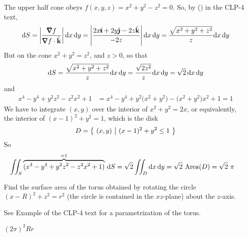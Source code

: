 \begin{solution} 
The upper half cone obeys $f(x,y,z)=x^2+y^2-z^2=0$. So,
by () in the CLP-4 text,
\begin{equation*}
\dee{S}=\left|\frac{\vnabla f}{\vnabla f\cdot\hk}\right|\dee{x}\,\dee{y}
=\left|\frac{2x\hi+2y\hj-2z\hk}{-2z}\right|\dee{x}\,\dee{y}
=\frac{\sqrt{x^2+y^2+z^2}}{z}\dee{x}\,\dee{y}
\end{equation*}
But on the cone $x^2+y^2=z^2$, and $z>0$, so that
\begin{equation*}
\mathrm{d}S=\frac{\sqrt{x^2+y^2+z^2}}{z}\mathrm{d}x\,\mathrm{d}y
=\frac{\sqrt{2z^2}}{z}\mathrm{d}x\,\mathrm{d}y
=\sqrt{2}\,\mathrm{d}x\,\mathrm{d}y
\end{equation*}
and
\begin{align*}
x^4-y^4+y^2z^2-z^2x^2+1
&=x^4-y^4+y^2\big(x^2+y^2\big)-\big(x^2+y^2)x^2+1
=1
\end{align*}
We have to integrate $(x,y)$ over the interior of $x^2+y^2=2x$,
or equivalently, the interior of $(x-1)^2+y^2=1$,
which is the disk
\begin{equation*}
D=\big\{ \ (x,y)\ \big|\ (x-1)^2+y^2\le 1\ \big\}
\end{equation*}
So
\begin{align*}
\iint_S\overbrace{(x^4-y^4+y^2z^2-z^2x^2+1)}^{=1}\,\mathrm{d}S
&=\sqrt{2}\iint_D \mathrm{d}x\,\mathrm{d}y
=\sqrt{2}\ \text{Area}(D)
=\sqrt{2}\ \pi
\end{align*}
\end{solution}

\begin{question}
Find the surface area of the torus obtained by rotating the
circle $(x-R)^2+z^2=r^2$ (the circle is contained in the $xz$-plane)
 about the $z$-axis.
\end{question}

\begin{hint} 
See Example  of the CLP-4 text for a parametrization
of the torus.
\end{hint}

\begin{answer} 
$(2\pi)^2 Rr$
\end{answer}

